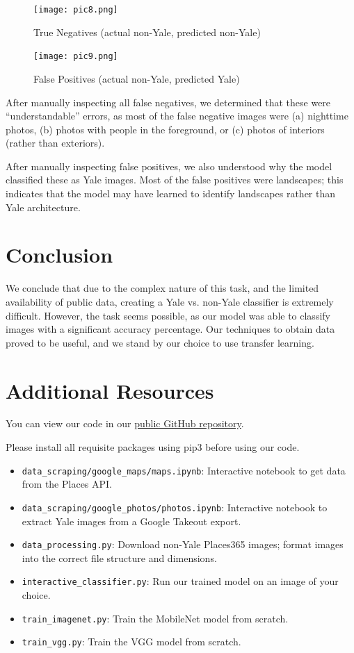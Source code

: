 \documentclass[letterpaper]{article} %
\begin{document}
\begin{figure}
    \centering
    \texttt{[image: pic8.png]}
    \caption{True Negatives (actual non-Yale, predicted non-Yale)}
    \label{fig:enter-label}
\end{figure}

\begin{figure}
    \centering
    \texttt{[image: pic9.png]}
    \caption{False Positives (actual non-Yale, predicted Yale)}
    \label{fig:enter-label}
\end{figure}

After manually inspecting all false negatives, we determined that these were “understandable” errors, as most of the false negative images were (a) nighttime photos, (b) photos with people in the foreground, or (c) photos of interiors (rather than exteriors).

After manually inspecting false positives, we also understood why the model classified these as Yale images. Most of the false positives were landscapes; this indicates that the model may have learned to identify landscapes rather than Yale architecture.

\section{Conclusion}
We conclude that due to the complex nature of this task, and the limited availability of public data, creating a Yale vs. non-Yale classifier is extremely difficult. However, the task seems possible, as our model was able to classify images with a significant accuracy percentage. Our techniques to obtain data proved to be useful, and we stand by our choice to use transfer learning.

\section{Additional Resources}
You can view our code in our \href{https://github.com/EricYale/EENG439-Final-Project}{public GitHub repository}.

Please install all requisite packages using pip3 before using our code.

\begin{itemize}
    \item \texttt{data\_scraping/google\_maps/maps.ipynb}: Interactive notebook to get data from the Places API.
    \item \texttt{data\_scraping/google\_photos/photos.ipynb}: Interactive notebook to extract Yale images from a Google Takeout export.
    \item \texttt{data\_processing.py}: Download non-Yale Places365 images; format images into the correct file structure and dimensions.
    \item \texttt{interactive\_classifier.py}: Run our trained model on an image of your choice.
    \item \texttt{train\_imagenet.py}: Train the MobileNet model from scratch.
    \item \texttt{train\_vgg.py}: Train the VGG model from scratch.
\end{itemize}
\end{document}
